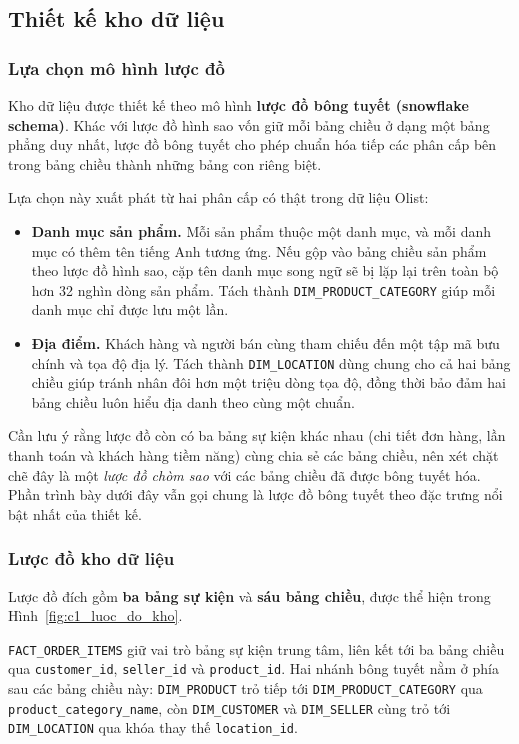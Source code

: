 \subsection{Thiết kế kho dữ liệu}

\subsubsection{Lựa chọn mô hình lược đồ}

Kho dữ liệu được thiết kế theo mô hình \textbf{lược đồ bông tuyết (snowflake schema)}. Khác với lược đồ hình sao vốn giữ mỗi bảng chiều ở dạng một bảng phẳng duy nhất, lược đồ bông tuyết cho phép chuẩn hóa tiếp các phân cấp bên trong bảng chiều thành những bảng con riêng biệt.

Lựa chọn này xuất phát từ hai phân cấp có thật trong dữ liệu Olist:

\begin{itemize}\setlength{\itemsep}{2pt}
  \item \textbf{Danh mục sản phẩm.} Mỗi sản phẩm thuộc một danh mục, và mỗi danh mục có thêm tên tiếng Anh tương ứng. Nếu gộp vào bảng chiều sản phẩm theo lược đồ hình sao, cặp tên danh mục song ngữ sẽ bị lặp lại trên toàn bộ hơn 32 nghìn dòng sản phẩm. Tách thành \texttt{DIM\_PRODUCT\_CATEGORY} giúp mỗi danh mục chỉ được lưu một lần.
  \item \textbf{Địa điểm.} Khách hàng và người bán cùng tham chiếu đến một tập mã bưu chính và tọa độ địa lý. Tách thành \texttt{DIM\_LOCATION} dùng chung cho cả hai bảng chiều giúp tránh nhân đôi hơn một triệu dòng tọa độ, đồng thời bảo đảm hai bảng chiều luôn hiểu địa danh theo cùng một chuẩn.
\end{itemize}

Cần lưu ý rằng lược đồ còn có ba bảng sự kiện khác nhau (chi tiết đơn hàng, lần thanh toán và khách hàng tiềm năng) cùng chia sẻ các bảng chiều, nên xét chặt chẽ đây là một \textit{lược đồ chòm sao} với các bảng chiều đã được bông tuyết hóa. Phần trình bày dưới đây vẫn gọi chung là lược đồ bông tuyết theo đặc trưng nổi bật nhất của thiết kế.

\subsubsection{Lược đồ kho dữ liệu}

Lược đồ đích gồm \textbf{ba bảng sự kiện} và \textbf{sáu bảng chiều}, được thể hiện trong Hình~\ref{fig:c1_luoc_do_kho}.

\texttt{FACT\_ORDER\_ITEMS} giữ vai trò bảng sự kiện trung tâm, liên kết tới ba bảng chiều qua \texttt{customer\_id}, \texttt{seller\_id} và \texttt{product\_id}. Hai nhánh bông tuyết nằm ở phía sau các bảng chiều này: \texttt{DIM\_PRODUCT} trỏ tiếp tới \texttt{DIM\_PRODUCT\_CATEGORY} qua \texttt{product\_category\_name}, còn \texttt{DIM\_CUSTOMER} và \texttt{DIM\_SELLER} cùng trỏ tới \texttt{DIM\_LOCATION} qua khóa thay thế \texttt{location\_id}.

